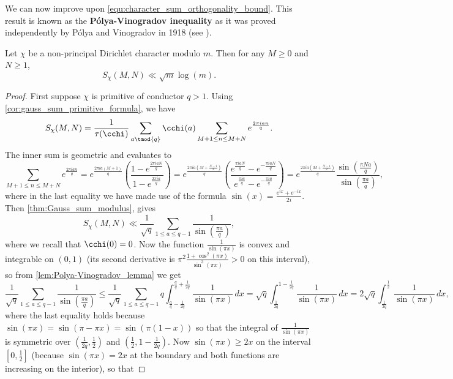     We can now improve upon \cref{equ:character_sum_orthogonality_bound}. This result is known as the \textbf{P\'olya-Vinogradov inequality} as it was proved independently by P\'olya and Vinogradov in 1918 (see \cite{polya1918verteilung}).

    \begin{theorem}
      Let $\chi$ be a non-principal Dirichlet character modulo $m$. Then for any $M \ge 0$ and $N \ge 1$,
      \[
        S_{\chi}(M,N) \ll \sqrt{m}\log(m).
      \]
    \end{theorem}
    \begin{proof}
      First suppose $\chi$ is primitive of conductor $q > 1$. Using \cref{cor:gauss_sum_primitive_formula}, we have
      \[
        S_{\chi}(M,N) = \frac{1}{\tau(\cchi)}\sum_{a \tmod{q}}\cchi(a)\sum_{M+1 \le n \le M+N}e^{\frac{2\pi ian}{q}}.
      \]
      The inner sum is geometric and evaluates to
      \[
        \sum_{M+1 \le n \le M+N}e^{\frac{2\pi ian}{q}} = e^{\frac{2\pi ia(M+1)}{q}}\left(\frac{1-e^{\frac{2\pi iaN}{q}}}{1-e^{\frac{2\pi ia}{q}}}\right) = e^{\frac{2\pi ia\left(M+\frac{N-1}{2}\right)}{q}}\left(\frac{e^{\frac{\pi iaN}{q}}-e^{-\frac{\pi iaN}{q}}}{e^{\frac{\pi ia}{q}}-e^{-\frac{\pi ia}{q}}}\right) = e^{\frac{2\pi ia\left(M+\frac{N-1}{2}\right)}{q}}\frac{\sin\left(\frac{\pi Na}{q}\right)}{\sin\left(\frac{\pi a}{q}\right)},
      \]
      where in the last equality we have made use of the formula $\sin(x) = \frac{e^{ix}+e^{-ix}}{2i}$. Then \cref{thm:Gauss_sum_modulus}, gives
      \[
        S_{\chi}(M,N) \ll \frac{1}{\sqrt{q}}\sum_{1 \le a \le q-1}\frac{1}{\sin\left(\frac{\pi a}{q}\right)},
      \]
      where we recall that $\cchi(0) = 0$. Now the function $\frac{1}{\sin(\pi x)}$ is convex and integrable on $(0,1)$ (its second derivative is $\pi^{2}\frac{1+\cos^{2}(\pi x)}{\sin^{3}(\pi x)} > 0$ on this interval), so from \cref{lem:Polya-Vinogradov_lemma} we get
      \[
        \frac{1}{\sqrt{q}}\sum_{1 \le a \le q-1}\frac{1}{\sin\left(\frac{\pi a}{q}\right)} \le \frac{1}{\sqrt{q}}\sum_{1 \le a \le q-1}q\int_{\frac{a}{q}-\frac{1}{2q}}^{\frac{a}{q}+\frac{1}{2q}}\frac{1}{\sin(\pi x)}\,dx = \sqrt{q}\int_{\frac{1}{2q}}^{1-\frac{1}{2q}}\frac{1}{\sin(\pi x)}\,dx = 2\sqrt{q}\int_{\frac{1}{2q}}^{\frac{1}{2}}\frac{1}{\sin(\pi x)}\,dx,
      \]
      where the last equality holds because $\sin(\pi x) = \sin(\pi-\pi x) = \sin(\pi(1-x))$ so that the integral of $\frac{1}{\sin(\pi x)}$ is symmetric over $\left(\frac{1}{2q},\frac{1}{2}\right)$ and $\left(\frac{1}{2},1-\frac{1}{2q}\right)$. Now $\sin(\pi x) \ge 2x$ on the interval $[0,\frac{1}{2}]$ (because $\sin(\pi x) = 2x$ at the boundary and both functions are increasing on the interior), so that

\end{proof}
